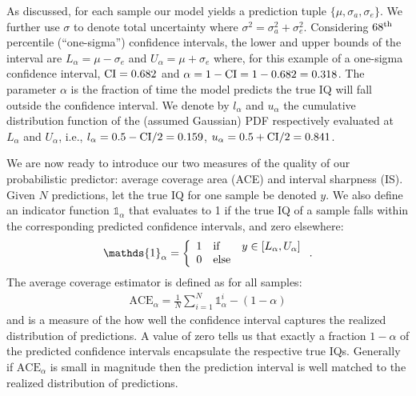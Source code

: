 As discussed, for each sample our model yields a prediction tuple $\{\mu, \sigma_a, \sigma_e\}$.  We further use $\sigma$ to denote total uncertainty where $\sigma^2 = \sigma_{a}^2 + \sigma_{e}^2$.  Considering $68^{\rm th}$ percentile (``one-sigma'') confidence intervals, the lower and upper bounds of the interval are $L_\alpha = \mu - \sigma_e$ and $U_\alpha = \mu+ \sigma_e$ where, for this example of a one-sigma confidence interval, $\rm{CI} = 0.682$ and $\alpha = 1-\rm{CI} = 1 - 0.682 = 0.318$. The parameter $\alpha$ is the fraction of time the model predicts the true IQ will fall outside the confidence interval. We denote by $l_\alpha$ and $u_\alpha$ the cumulative distribution function of the (assumed Gaussian) PDF respectively evaluated at $L_\alpha$ and $U_\alpha$, i.e., $l_\alpha = 0.5 - \rm{CI}/2 = 0.159$, $u_\alpha = 0.5 + \rm{CI}/2 = 0.841$. 


We are now ready to introduce our two measures of the quality of our probabilistic predictor: average coverage area (ACE) and interval sharpness (IS).
Given $N$ predictions, let the true IQ for one sample be denoted $y$.  We also define an indicator function $\mathds{1}_\alpha$ that evaluates to 1 if the true IQ of a sample falls within the corresponding predicted confidence intervals, and zero elsewhere:
\begin{align*}
        \mathds{1}_\alpha=\left\{\begin{array}{lll}
1 & {\rm if} &  y \in\left[L_{\alpha}, U_{\alpha}\right] \\
0 & {\rm else}
\end{array}\right. .
    \end{align*}
The average coverage estimator is defined as for all samples:
\begin{align*}
        \mathrm{ACE}_{\alpha}=\frac{1}{N} \sum_{i=1}^{N} \mathds{1}_\alpha^{i} - (1-\alpha)
\end{align*}
and is a measure of the how well the confidence interval captures the realized distribution of predictions.  A value of zero tells us that exactly a fraction $1-\alpha$ of the predicted confidence intervals encapsulate the respective true IQs.  Generally if $\mathrm{ACE}_\alpha$ is small in magnitude then the prediction interval is well matched to the realized distribution of predictions.



